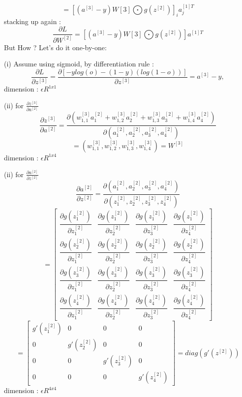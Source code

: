 \documentclass{article}
\begin{document}
\[
= [ (a^{[3]}-y)W[3] \bigodot g(z^{[2]}) ]_i a_j^{[1]T} 
\]
stacking up again :
\[
\frac{\partial L }{\partial W^{[2]}} = [ (a^{[3]}-y)W[3] \bigodot g(z^{[2]}) ] a^{[1]T} 
\]
But How ? Let's do it one-by-one:\newline 

(i) Assume using sigmoid, by differentiation rule : \newline
\[ \frac{\partial L }{\partial z^{[3]}} = \frac{\partial [-ylog(o)-(1-y)(log(1-o))] }{\partial z^{[3]}} = a^{[3]}-y ,\]
 dimension :   \( \epsilon R^{1x1} \)  \newline \newline

(ii) for \( \frac{\partial z^{[3]} }{\partial a^{[2]}} \) \newline
\[ 
\frac{\partial z^{[3]} }{\partial a^{[2]}} = 
\frac{\partial (w_{1,1}^{[3]}a_1^{[2]}+w_{1,2}^{[3]}a_2^{[2]}+w_{1,3}^{[3]}a_3^{[2]}+w_{1,4}^{[3]}a_4^{[2]}) }
{\partial (a_1^{[2]},a_2^{[2]},a_3^{[2]},a_4^{[2]})}
\]
\[ 
= (w_{1,1}^{[3]},w_{1,2}^{[3]},w_{1,3}^{[3]},w_{1,4}^{[3]}) = W^{[3]}
\]
dimension :   \( \epsilon R^{1x4} \)  \newline \newline

(ii) for \( \frac{\partial a^{[2]} }{\partial z^{[2]}} \) \newline
\[ 
\frac{\partial a^{[2]} }{\partial z^{[2]}} = 
\frac{\partial (a_1^{[2]},a_2^{[2]},a_3^{[2]},a_4^{[2]}) }
{\partial (z_1^{[2]},z_2^{[2]},z_3^{[2]},z_4^{[2]})}
\]
\[
=\begin{bmatrix}
 \dfrac{\partial g(z_1^{[2]})}{\partial z_1^{[2]}} & \dfrac{\partial g(z_1^{[2]})}{\partial z_2^{[2]}} & \dfrac{\partial g(z_1^{[2]})}{\partial z_3^{[2]}} & \dfrac{\partial g(z_1^{[2]})}{\partial z_4^{[2]}} \\ 
 \dfrac{\partial g(z_2^{[2]})}{\partial z_1^{[2]}} & \dfrac{\partial g(z_2^{[2]})}{\partial z_2^{[2]}} & \dfrac{\partial g(z_2^{[2]})}{\partial z_3^{[2]}} & \dfrac{\partial g(z_2^{[2]})}{\partial z_4^{[2]}} \\ 
 \dfrac{\partial g(z_3^{[2]})}{\partial z_1^{[2]}} & \dfrac{\partial g(z_3^{[2]})}{\partial z_2^{[2]}} & \dfrac{\partial g(z_3^{[2]})}{\partial z_3^{[2]}} & \dfrac{\partial g(z_3^{[2]})}{\partial z_4^{[2]}} \\ 
 \dfrac{\partial g(z_4^{[2]})}{\partial z_1^{[2]}} & \dfrac{\partial g(z_4^{[2]})}{\partial z_2^{[2]}} & \dfrac{\partial g(z_4^{[2]})}{\partial z_3^{[2]}} & \dfrac{\partial g(z_4^{[2]})}{\partial z_4^{[2]}}
\end{bmatrix}
\]
\[
=\begin{bmatrix}
 g'(z_1^{[2]}) & 0 & 0 & 0  \\ 
 0 & g'(z_2^{[2]}) & 0 & 0 \\ 
0 & 0 &  g'(z_3^{[2]}) &0 \\ 
 0 & 0 & 0 & g'(z_4^{[2]})
\end{bmatrix} = diag(g'(z^{[2]}))
\]
dimension :   \( \epsilon R^{4x4} \)  \newline \newline
\end{document}
